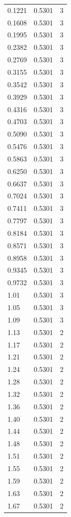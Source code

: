 \begin{longtable}{lrr}
  0.1221 & 0.5301 & 3 \\
  0.1608 & 0.5301 & 3 \\
  0.1995 & 0.5301 & 3 \\
  0.2382 & 0.5301 & 3 \\
  0.2769 & 0.5301 & 3 \\
  0.3155 & 0.5301 & 3 \\
  0.3542 & 0.5301 & 3 \\
  0.3929 & 0.5301 & 3 \\
  0.4316 & 0.5301 & 3 \\
  0.4703 & 0.5301 & 3 \\
  0.5090 & 0.5301 & 3 \\
  0.5476 & 0.5301 & 3 \\
  0.5863 & 0.5301 & 3 \\
  0.6250 & 0.5301 & 3 \\
  0.6637 & 0.5301 & 3 \\
  0.7024 & 0.5301 & 3 \\
  0.7411 & 0.5301 & 3 \\
  0.7797 & 0.5301 & 3 \\
  0.8184 & 0.5301 & 3 \\
  0.8571 & 0.5301 & 3 \\
  0.8958 & 0.5301 & 3 \\
  0.9345 & 0.5301 & 3 \\
  0.9732 & 0.5301 & 3 \\
  1.01 & 0.5301 & 3 \\
  1.05 & 0.5301 & 3 \\
  1.09 & 0.5301 & 3 \\
  1.13 & 0.5301 & 2 \\
  1.17 & 0.5301 & 2 \\
  1.21 & 0.5301 & 2 \\
  1.24 & 0.5301 & 2 \\
  1.28 & 0.5301 & 2 \\
  1.32 & 0.5301 & 2 \\
  1.36 & 0.5301 & 2 \\
  1.40 & 0.5301 & 2 \\
  1.44 & 0.5301 & 2 \\
  1.48 & 0.5301 & 2 \\
  1.51 & 0.5301 & 2 \\
  1.55 & 0.5301 & 2 \\
  1.59 & 0.5301 & 2 \\
  1.63 & 0.5301 & 2 \\
  1.67 & 0.5301 & 2 \\

\end{longtable}
